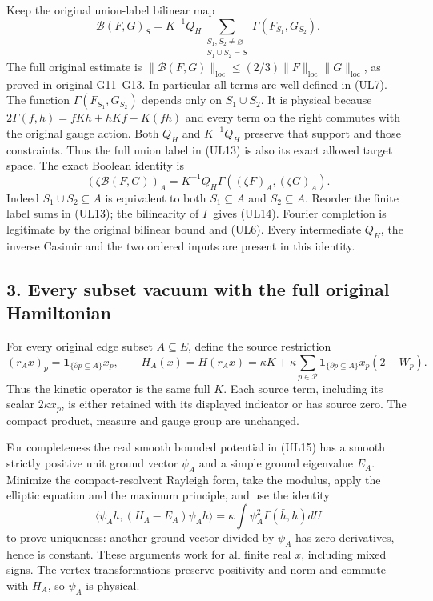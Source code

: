\documentclass[11pt]{article}
\begin{document}
Keep the original union-label bilinear map
\[
 \mathcal B(F,G)_S
 =K^{-1}Q_H\sum_{\substack{S_1,S_2\ne\varnothing\\S_1\cup S_2=S}}
                       \Gamma(F_{S_1},G_{S_2}).
 \tag{UL13}
\]
The full original estimate is \(\|\mathcal B(F,G)\|_{\mathrm{loc}}\le(2/3)\|F\|_{\mathrm{loc}}\|G\|_{\mathrm{loc}}\), as proved in original G11–G13. In particular all terms are well-defined in (UL7).
The function \(\Gamma(F_{S_1},G_{S_2})\) depends only on \(S_1\cup S_2\). It is physical because
\(2\Gamma(f,h)=fKh+hKf-K(fh)\) and every term on the right commutes with the original gauge action. Both \(Q_H\) and \(K^{-1}Q_H\) preserve that support and those constraints. Thus the full union label in (UL13) is also its exact allowed target space. The exact Boolean identity is
\[
 \boxed{(\zeta\mathcal B(F,G))_A
     =K^{-1}Q_H\Gamma((\zeta F)_A,(\zeta G)_A).}
 \tag{UL14}
\]
Indeed \(S_1\cup S_2\subseteq A\) is equivalent to both \(S_1\subseteq A\) and \(S_2\subseteq A\). Reorder the finite label sums in (UL13); the bilinearity of \(\Gamma\) gives (UL14). Fourier completion is legitimate by the original bilinear bound and (UL6). Every intermediate \(Q_H\), the inverse Casimir and the two ordered inputs are present in this identity.

\subsection*{3. Every subset vacuum with the full original Hamiltonian}

For every original edge subset \(A\subseteq E\), define the source restriction
\[
 (r_Ax)_p=\mathbf1_{\{\partial p\subseteq A\}}x_p,\qquad
 H_A(x)=H(r_Ax)
       =\kappa K+\kappa\sum_{p\in\mathcal P}
                \mathbf1_{\{\partial p\subseteq A\}}x_p(2-W_p).
 \tag{UL15}
\]
Thus the kinetic operator is the same full \(K\). Each source term, including its scalar \(2\kappa x_p\), is either retained with its displayed indicator or has source zero. The compact product, measure and gauge group are unchanged.

For completeness the real smooth bounded potential in (UL15) has a smooth strictly positive unit ground vector \(\psi_A\) and a simple ground eigenvalue \(E_A\). Minimize the compact-resolvent Rayleigh form, take the modulus, apply the elliptic equation and the maximum principle, and use the identity
\[
 \langle\psi_Ah,(H_A-E_A)\psi_Ah\rangle
 =\kappa\int\psi_A^2\Gamma(\bar h,h)dU
 \tag{UL16}
\]
to prove uniqueness: another ground vector divided by \(\psi_A\) has zero derivatives, hence is constant. These arguments work for all finite real \(x\), including mixed signs. The vertex transformations preserve positivity and norm and commute with \(H_A\), so \(\psi_A\) is physical.
\end{document}
